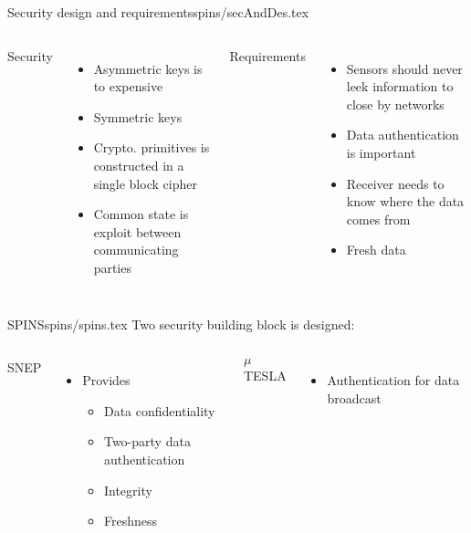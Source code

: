 \begin{notedFrame}{Security design and requirements}{spins/secAndDes.tex}

    \begin{columns}[T, onlytextwidth]
            \alert{Security}
            \begin{itemize}
                \item Asymmetric keys is to expensive
                \item Symmetric keys
                \item Crypto. primitives is constructed in a single block cipher
                \item Common state is exploit between communicating parties
            \end{itemize}
            \alert{Requirements}
            \begin{itemize}
                \item Sensors should never leek information to close by networks
                \item Data authentication is important
                \item Receiver needs to know where the data comes from
                \item Fresh data
            \end{itemize}
    \end{columns}
\end{notedFrame}

\begin{notedFrame}{SPINS}{spins/spins.tex}
    Two security building block is designed:

    \begin{columns}[T, onlytextwidth]
        \alert{SNEP}
        \begin{itemize}
            \item Provides
            \begin{itemize}
                \item Data confidentiality
                \item Two-party data authentication
                \item Integrity
                \item Freshness
            \end{itemize}
        \end{itemize}
        
        \alert{$\mu$TESLA}
        \begin{itemize}
            \item Authentication for data broadcast
        \end{itemize}
    \end{columns}
\end{notedFrame}

